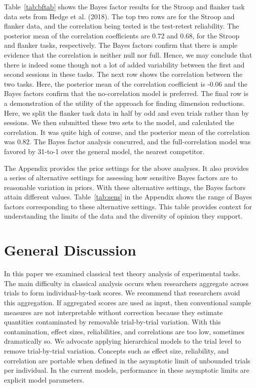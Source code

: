 \documentclass[english,man]{apa6}
\theoremstyle{definition}
\theoremstyle{definition}
\theoremstyle{definition}
\theoremstyle{remark}
\begin{document}
Table~\ref{tab:bftab} shows the Bayes factor results for the Stroop and
flanker task data sets from Hedge et al. (2018). The top two rows are
for the Stroop and flanker data, and the correlation being tested is the
test-retest reliability. The posterior mean of the correlation
coefficients are 0.72 and 0.68, for the Stroop and flanker tasks,
respectively. The Bayes factors confirm that there is ample evidence
that the correlation is neither null nor full. Hence, we may conclude
that there is indeed some though not a lot of added variability between
the first and second sessions in these tasks. The next row shows the
correlation between the two tasks. Here, the posterior mean of the
correlation coefficient is -0.06 and the Bayes factors confirm that the
no-correlation model is preferred. The final row is a demonstration of
the utility of the approach for finding dimension reductions. Here, we
split the flanker task data in half by odd and even trials rather than
by sessions. We then submitted these two sets to the model, and
calculated the correlation. It was quite high of course, and the
posterior mean of the correlation was 0.82. The Bayes factor analysis
concurred, and the full-correlation model was favored by 31-to-1 over
the general model, the nearest competitor.

The Appendix provides the prior settings for the above analyses. It also
provides a series of alternative settings for assessing how sensitive
Bayes factors are to reasonable variation in priors. With these
alternative settings, the Bayes factors attain different values.
Table~\ref{tab:sens} in the Appendix shows the range of Bayes factors
corresponding to these alternative settings. This table provides context
for understanding the limits of the data and the diversity of opinion
they support.

\section{General Discussion}\label{general-discussion}

In this paper we examined classical test theory analysis of experimental
tasks. The main difficulty in classical analysis occurs when researchers
aggregate across trials to form individual-by-task scores. We recommend
that researchers avoid this aggregation. If aggregated scores are used
as input, then conventional sample measures are not interpretable
without correction because they estimate quantities contaminated by
removable trial-by-trial variation. With this contamination, effect
sizes, reliabilities, and correlations are too low, sometimes
dramatically so. We advocate applying hierarchical models to the trial
level to remove trial-by-trial variation. Concepts such as effect size,
reliability, and correlation are portable when defined in the asymptotic
limit of unbounded trials per individual. In the current models,
performance in these asymptotic limits are explicit model parameters.
\end{document}
